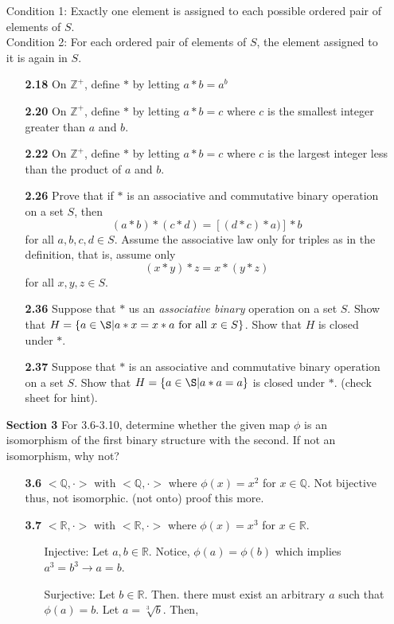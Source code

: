 \documentclass[11pt]{article}
\theoremstyle{plain}
\theoremstyle{definition}
\newcommand{\R}{\mathbb{R}}
\newcommand{\Q}{\mathbb{Q}}
\newcommand{\Zplus}{\mathbb{Z^+}}
\begin{document}
\begin{enumerate}
    Condition 1: Exactly one element is assigned to each possible ordered pair of elements of $S$.\\
    Condition 2: For each ordered pair of elements of $S$, the element assigned to it is again in $S$.
    
    \begin{enumerate}

        \item[\textbf{2.18}] On $\Zplus$, define $*$ by letting $a*b = a^b$
        
        \item[\textbf{2.20}] On $\Zplus$, define $*$ by letting $a * b = c$ where $c$ is the smallest integer greater than $a$ and $b$.
        
        \item[\textbf{2.22}] On $\Zplus$, define $*$ by letting $a * b = c$ where $c$ is the largest integer less than the product of $a$ and $b$.
        
        \item[\textbf{2.26}] Prove that if $*$ is an associative and commutative binary operation on a set $S$, then \[ (a*b)*(c*d) = [(d*c)*a)]*b \] for all $a,b,c,d \in S$. Assume the associative law only for triples as in the definition, that is, assume only \[(x*y)*z = x*(y*z)\] for all $x,y,z \in S$.
        
        \item[\textbf{2.36}] Suppose that $*$ us an \textit{associative binary} operation on a set $S$. Show that $H = \{a \in \S | a*x = x*a \text{ for all } x \in S\}$. Show that $H$ is closed under $*$. 
        
        \item[\textbf{2.37}] Suppose that $*$ is an associative and commutative binary operation on a set $S$. Show that $H = \{a \in \S | a*a = a\}$ is closed under $*$. (check sheet for hint).
        
        
    \end{enumerate}
    
    
\item[\textbf{Section 3}]
    For 3.6-3.10, determine whether the given map $\phi$ is an isomorphism of the first binary structure with the second. If not an isomorphism, why not?
    
    \begin{enumerate}
        \item[\textbf{3.6}] $<\Q,\cdot>$ with $<\Q,\cdot>$ where $\phi (x) = x^2$ for $x \in \Q$.
        	Not bijective thus, not isomorphic. (not onto) proof this more.
        \item[\textbf{3.7}] $<\R,\cdot>$ with $<\R,\cdot>$ where $\phi (x) = x^3$ for $x \in \R$.
        	\begin{enumerate}
        		\item[Injective:] Let $a,b \in \R$. Notice, $\phi(a) = \phi(b)$ which implies  $a^3 = b^3 \rightarrow a=b$.
        		\item[Surjective:] Let $b \in \R$. Then. there must exist an arbitrary $a$ such that $\phi(a) = b$. Let $a=\sqrt[3]{b}.$ Then,
        	\end{enumerate}
        	

\end{enumerate}
\end{enumerate}
\end{document}
